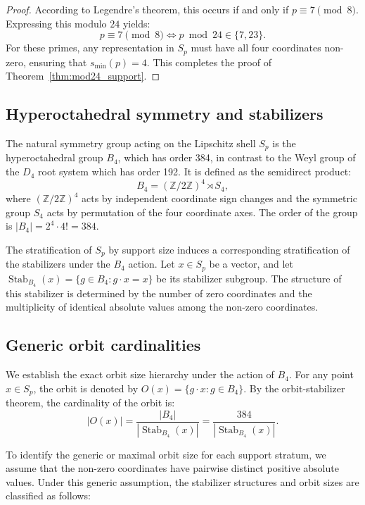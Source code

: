 \documentclass[11pt,a4paper]{article}
\theoremstyle{definition}
\begin{document}
\begin{proof}
		According to Legendre's theorem, this occurs if and only if $p \equiv 7 \pmod 8$. Expressing this modulo $24$ yields:
		\begin{equation}
			p \equiv 7 \pmod 8 \iff p \bmod 24 \in \{7, 23\}.
		\end{equation}
		For these primes, any representation in $S_p$ must have all four coordinates non-zero, ensuring that $s_{\min}(p) = 4$. This completes the proof of Theorem~\ref{thm:mod24_support}.
	\end{proof}
	
	\subsection{Hyperoctahedral symmetry and stabilizers}
	The natural symmetry group acting on the Lipschitz shell $S_p$ is the hyperoctahedral group $B_4$, which has order 384, in contrast to the Weyl group of the $D_4$ root system which has order 192. It is defined as the semidirect product:
	\begin{equation}
		B_4 = (\mathbb{Z}/2\mathbb{Z})^4 \rtimes S_4,
	\end{equation}
	where $(\mathbb{Z}/2\mathbb{Z})^4$ acts by independent coordinate sign changes and the symmetric group $S_4$ acts by permutation of the four coordinate axes. The order of the group is $|B_4| = 2^4 \cdot 4! = 384$.
	
	The stratification of $S_p$ by support size induces a corresponding stratification of the stabilizers under the $B_4$ action. Let $x \in S_p$ be a vector, and let $\operatorname{Stab}_{B_4}(x) = \{ g \in B_4 : g \cdot x = x \}$ be its stabilizer subgroup. The structure of this stabilizer is determined by the number of zero coordinates and the multiplicity of identical absolute values among the non-zero coordinates.
	
	\subsection{Generic orbit cardinalities}
	We establish the exact orbit size hierarchy under the action of $B_4$. For any point $x \in S_p$, the orbit is denoted by $O(x) = \{ g \cdot x : g \in B_4 \}$. By the orbit-stabilizer theorem, the cardinality of the orbit is:
	\begin{equation}
		|O(x)| = \frac{|B_4|}{|\operatorname{Stab}_{B_4}(x)|} = \frac{384}{|\operatorname{Stab}_{B_4}(x)|}.
	\end{equation}
	
	To identify the generic or maximal orbit size for each support stratum, we assume that the non-zero coordinates have pairwise distinct positive absolute values. Under this generic assumption, the stabilizer structures and orbit sizes are classified as follows:
	
\end{document}
